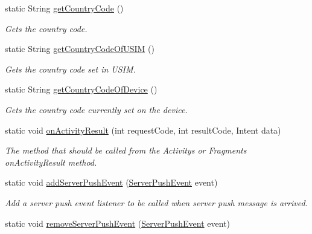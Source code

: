 \begin{DoxyCompactItemize}
static String \hyperlink{classcom_1_1toast_1_1android_1_1gamebase_1_1_gamebase_a57662f504668587ba2a1d667a48c9732}{get\+Country\+Code} ()
\begin{DoxyCompactList}\small\item\em Gets the country code. \end{DoxyCompactList}\item 
static String \hyperlink{classcom_1_1toast_1_1android_1_1gamebase_1_1_gamebase_aefed09bea0026a9e6de3c0506ebd5617}{get\+Country\+Code\+Of\+U\+S\+IM} ()
\begin{DoxyCompactList}\small\item\em Gets the country code set in U\+S\+IM. \end{DoxyCompactList}\item 
static String \hyperlink{classcom_1_1toast_1_1android_1_1gamebase_1_1_gamebase_aa5cb9db9a02d57d19f78a34a1adbdc95}{get\+Country\+Code\+Of\+Device} ()
\begin{DoxyCompactList}\small\item\em Gets the country code currently set on the device. \end{DoxyCompactList}\item 
static void \hyperlink{classcom_1_1toast_1_1android_1_1gamebase_1_1_gamebase_a74cd8c74ed834e846c05c598708f1e8b}{on\+Activity\+Result} (int request\+Code, int result\+Code, Intent data)
\begin{DoxyCompactList}\small\item\em The method that should be called from the Activity\textquotesingle{}s or Fragment\textquotesingle{}s on\+Activity\+Result method. \end{DoxyCompactList}\item 
static void \hyperlink{classcom_1_1toast_1_1android_1_1gamebase_1_1_gamebase_a1cae88da5b12ad9563fbfa619870f11b}{add\+Server\+Push\+Event} (\hyperlink{interfacecom_1_1toast_1_1android_1_1gamebase_1_1serverpush_1_1_server_push_event}{Server\+Push\+Event} event)
\begin{DoxyCompactList}\small\item\em Add a server push event listener to be called when server push message is arrived. \end{DoxyCompactList}\item 
static void \hyperlink{classcom_1_1toast_1_1android_1_1gamebase_1_1_gamebase_a1aac5aefec7eee16ab9ca5522c19dd75}{remove\+Server\+Push\+Event} (\hyperlink{interfacecom_1_1toast_1_1android_1_1gamebase_1_1serverpush_1_1_server_push_event}{Server\+Push\+Event} event)

\end{DoxyCompactItemize}

